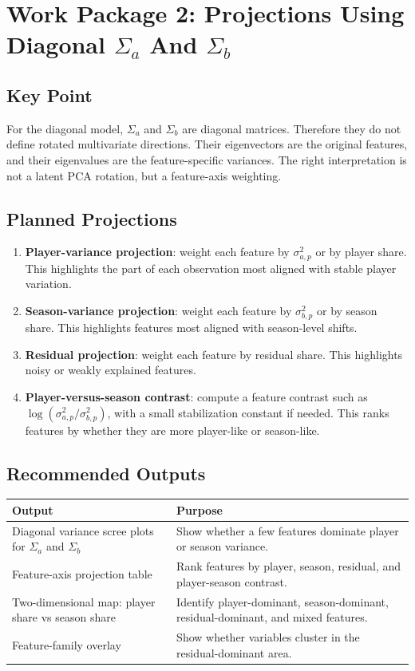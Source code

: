 \documentclass[11pt]{article}
\newcommand{\code}[1]{\texttt{\detokenize{#1}}}
\begin{document}
\section{Work Package 2: Projections Using Diagonal \texorpdfstring{\(\Sigma_a\) And \(\Sigma_b\)}{Sigma a And Sigma b}}

\subsection{Key Point}

For the diagonal model, \(\Sigma_a\) and \(\Sigma_b\) are diagonal matrices.
Therefore they do not define rotated multivariate directions. Their eigenvectors
are the original features, and their eigenvalues are the feature-specific
variances. The right interpretation is not a latent PCA rotation, but a
feature-axis weighting.

\subsection{Planned Projections}

\begin{enumerate}[leftmargin=*]
  \item \textbf{Player-variance projection}: weight each feature by
  \(\sigma^2_{a,p}\) or by player share. This highlights the part of each
  observation most aligned with stable player variation.
  \item \textbf{Season-variance projection}: weight each feature by
  \(\sigma^2_{b,p}\) or by season share. This highlights features most aligned
  with season-level shifts.
  \item \textbf{Residual projection}: weight each feature by residual share.
  This highlights noisy or weakly explained features.
  \item \textbf{Player-versus-season contrast}: compute a feature contrast such
  as \(\log(\sigma^2_{a,p} / \sigma^2_{b,p})\), with a small stabilization
  constant if needed. This ranks features by whether they are more player-like
  or season-like.
\end{enumerate}

\subsection{Recommended Outputs}

\begin{longtable}{L{0.32\textwidth}L{0.58\textwidth}}
\toprule
Output & Purpose \\
\midrule
\endhead
Diagonal variance scree plots for \(\Sigma_a\) and \(\Sigma_b\) &
Show whether a few features dominate player or season variance. \\
Feature-axis projection table &
Rank features by player, season, residual, and player-season contrast. \\
Two-dimensional map: player share vs season share &
Identify player-dominant, season-dominant, residual-dominant, and mixed
features. \\
Feature-family overlay &
Show whether \code{rate_*} variables cluster in the residual-dominant area. \\
\bottomrule
\end{longtable}
\end{document}
